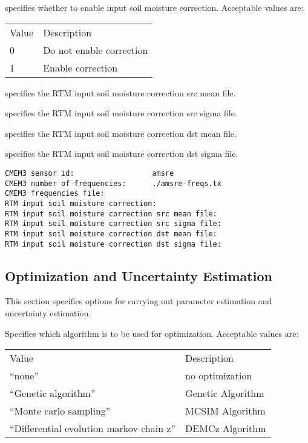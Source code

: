   specifies whether to
 enable input soil moisture correction.
 Acceptable values are:

 \begin{tabular}{ll}
 Value & Description              \\
 0     & Do not enable correction \\
 1     & Enable correction        \\
 \end{tabular}

  specifies
 the RTM input soil moisture correction src mean file.

  specifies
 the RTM input soil moisture correction src sigma file.

  specifies
 the RTM input soil moisture correction dst mean file.

  specifies
 the RTM input soil moisture correction dst sigma file.
 

 \begin{Verbatim}[frame=single]
CMEM3 sensor id:                  amsre
CMEM3 number of frequencies:      ./amsre-freqs.tx
CMEM3 frequencies file:
RTM input soil moisture correction:
RTM input soil moisture correction src mean file:
RTM input soil moisture correction src sigma file:
RTM input soil moisture correction dst mean file:
RTM input soil moisture correction dst sigma file:
 \end{Verbatim}

 
 \subsection{Optimization and Uncertainty Estimation}
 \label{ssec:optimization}
 This section specifies options for carrying out parameter estimation
 and uncertainty estimation.

  Specifies which 
 algorithm is to be used for optimization.
 Acceptable values are:

 \begin{tabular}{ll}
 Value                                     & Description         \\
 ``none''                                  & no optimization     \\
 ``Genetic algorithm''                     & Genetic Algorithm   \\
 ``Monte carlo sampling''                  & MCSIM Algorithm     \\
 ``Differential evolution markov chain z'' & DEMCz Algorithm     \\
 \end{tabular}

